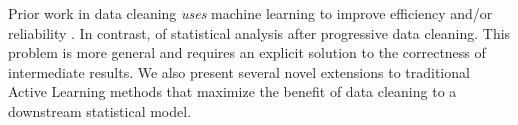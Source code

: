 Prior work in data cleaning \emph{uses} machine learning to improve efficiency and/or reliability \cite{DBLP:journals/pvldb/YakoutENOI11, gokhale2014corleone, yakout2013don, DBLP:journals/pvldb/HaasKWF015}.
In contrast, \sys of statistical analysis after progressive data cleaning.
This problem is more general and requires an explicit solution to the correctness of intermediate results.
We also present several novel extensions to traditional Active Learning methods that maximize the benefit of data cleaning to a downstream statistical model.









